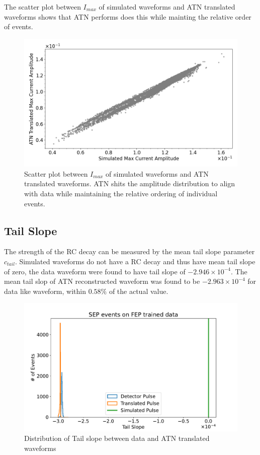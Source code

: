 The scatter plot between $I_{max}$ of simulated waveforms and ATN translated waveforms shows that ATN performs does this while mainting the relative order of events.

\begin{figure}[htb!]
\centering
\includegraphics[width=0.99\linewidth,trim={0pc 0pc 0pc 0pc},clip]{ch8/figs/SEP_scatter_current_amplitude.png}
\caption{Scatter plot between $I_{max}$ of simulated waveforms and ATN translated waveforms. ATN shits the amplitude distribution to align with data while maintaining the relative ordering of individual events.}
\label{fig:current_amp}
\end{figure}



\subsection{Tail Slope}
The strength of the RC decay can be measured by the mean tail slope parameter $c_{tail}$. Simulated waveforms do not have a RC decay and thus have mean tail slope of zero, the data waveform were found to have tail slope of $-2.946\times10^{-4}$. The mean tail slop of ATN reconstructed waveform was found to be $-2.963\times10^{-4}$ for data like waveform, within $0.58\%$ of the actual value.

\begin{figure}[htb!]
\centering
\includegraphics[width=0.97\linewidth,trim={2pc 0pc 2pc 0pc},clip]{ch8/figs/SEP_sim_ts.pdf}
\caption{ Distribution of Tail slope between data and ATN translated waveforms}
\label{ch8:fig:tail_slope_comp}
\end{figure}


